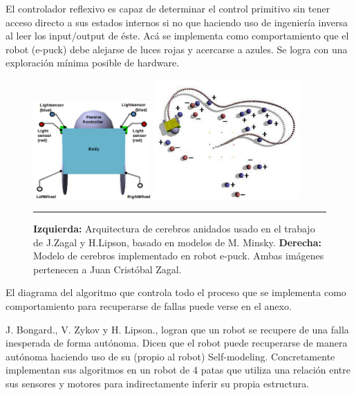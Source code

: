 El controlador reflexivo es capaz de determinar el control primitivo sin tener acceso directo  a sus estados internos si no que haciendo uso de ingeniería inversa al leer los input/output de éste. Acá se implementa como comportamiento que el robot (e-puck) debe alejarse de luces rojas y acercarse a azules. Se logra con una exploración mínima posible de hardware.

\begin{figure}[htbp]
	\centering
		\includegraphics[width=0.4\textwidth]{./Figures/robotTest.png}
		\includegraphics[width=0.5\textwidth]{./Figures/implementacion.png}
		\rule{35em}{0.5pt}
	\caption[Automodelado]{\textbf{Izquierda:} Arquitectura de cerebros anidados usado en el trabajo de J.Zagal y H.Lipson, basado en modelos de M. Minsky. \textbf{Derecha:} Modelo de cerebros implementado en robot e-puck. Ambas imágenes  pertenecen a Juan Cristóbal Zagal.}
	\label{fig:AutomodeladoTest}
\end{figure}


El diagrama del algoritmo que controla todo el proceso que se implementa como comportamiento para recuperarse de fallas puede verse en el anexo.

J. Bongard., V. Zykov y H. Lipson., logran que un robot se recupere de una falla inesperada de forma autónoma. Dicen que el robot puede recuperarse de manera autónoma haciendo uso de su (propio al robot) Self-modeling. Concretamente implementan sus algoritmos en un robot de 4 patas que utiliza una relación entre sus sensores y motores para indirectamente inferir su propia estructura.


